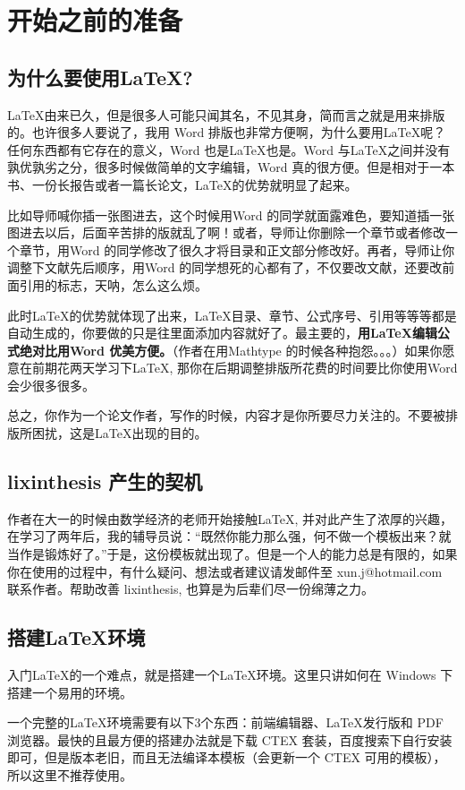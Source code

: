 \chapter{开始之前的准备}
\section{为什么要使用\LaTeX?}
\LaTeX 由来已久，但是很多人可能只闻其名，不见其身，简而言之就是用来排版的。也许很多人要说了，我用 Word 排版也非常方便啊，为什么要用\LaTeX 呢？任何东西都有它存在的意义，Word 也是\LaTeX 也是。Word 与\LaTeX 之间并没有孰优孰劣之分，很多时候做简单的文字编辑，Word 真的很方便。但是相对于一本书、一份长报告或者一篇长论文，\LaTeX 的优势就明显了起来。

比如导师喊你插一张图进去，这个时候用Word 的同学就面露难色，要知道插一张图进去以后，后面辛苦排的版就乱了啊！或者，导师让你删除一个章节或者修改一个章节，用Word 的同学修改了很久才将目录和正文部分修改好。再者，导师让你调整下文献先后顺序，用Word 的同学想死的心都有了，不仅要改文献，还要改前面引用的标志，天呐，怎么这么烦。

此时\LaTeX 的优势就体现了出来，\LaTeX 目录、章节、公式序号、引用等等等都是自动生成的，你要做的只是往里面添加内容就好了。最主要的，\textbf{用\LaTeX 编辑公式绝对比用Word 优美方便。}（作者在用Mathtype 的时候各种抱怨。。。）如果你愿意在前期花两天学习下\LaTeX, 那你在后期调整排版所花费的时间要比你使用Word 会少很多很多。

总之，你作为一个论文作者，写作的时候，内容才是你所要尽力关注的。不要被排版所困扰，这是\LaTeX 出现的目的。

\section{lixinthesis 产生的契机}
作者在大一的时候由数学经济的老师开始接触\LaTeX, 并对此产生了浓厚的兴趣，在学习了两年后，我的辅导员说：“既然你能力那么强，何不做一个模板出来？就当作是锻炼好了。”于是，这份模板就出现了。但是一个人的能力总是有限的，如果你在使用的过程中，有什么疑问、想法或者建议请发邮件至 {\sf xun.j@hotmail.com} 联系作者。帮助改善 lixinthesis, 也算是为后辈们尽一份绵薄之力。

\section{搭建\LaTeX 环境}
入门\LaTeX 的一个难点，就是搭建一个\LaTeX 环境。这里只讲如何在 Windows 下搭建一个易用的环境。

一个完整的\LaTeX 环境需要有以下3个东西：前端编辑器、\LaTeX 发行版和 PDF 浏览器。最快的且最方便的搭建办法就是下载 CTEX 套装，百度搜索下自行安装即可，但是版本老旧，而且无法编译本模板（会更新一个 CTEX 可用的模板），所以这里不推荐使用。

